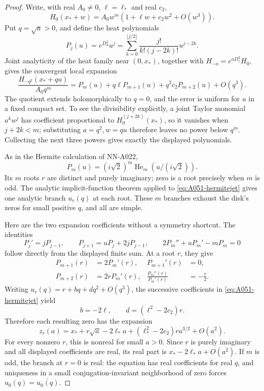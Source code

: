 \begin{proof}
Write, with real \(A_0\ne0\), \(\ell=\ell_*\) and real \(c_2\),
\[
 H_0(x_*+w)=A_0w^m(1+\ell w+c_2w^2+O(w^3)).
\]
Put \(q=\sqrt a>0\), and define the heat polynomials
\[
 P_j(u)=e^{D_u^2}u^j
       =\sum_{k=0}^{\lfloor j/2\rfloor}
          \frac{j!}{k!(j-2k)!}u^{j-2k}.
\]
Joint analyticity of the heat family near \((0,x_*)\), together
with \(H_{-a}=e^{aD_z^2}H_0\), gives the convergent local expansion
\begin{equation}\label{eq:A051-hermitejet}
 \frac{H_{-q^2}(x_*+qu)}{A_0q^m}
     =P_m(u)+q\ell P_{m+1}(u)+q^2c_2P_{m+2}(u)+O(q^3).
\end{equation}
The quotient extends holomorphically to \(q=0\), and the error
is uniform for \(u\) in a fixed compact set. To see the
divisibility explicitly, a joint Taylor monomial \(a^kw^j\)
has coefficient proportional to \(H_0^{(j+2k)}(x_*)\), so it
vanishes when \(j+2k<m\); substituting \(a=q^2,w=qu\)
therefore leaves no power below \(q^m\). Collecting the next
three powers gives exactly the displayed polynomials.

As in the Hermite calculation of NN-A022,
\[
       P_m(u)=(i\sqrt2)^m
                     \operatorname{He}_m(u/(i\sqrt2)).
\]
Its \(m\) roots \(r\) are distinct and purely imaginary;
zero is a root precisely when \(m\) is odd.
The analytic implicit-function theorem applied to
\eqref{eq:A051-hermitejet} gives one analytic branch \(u_r(q)\)
at each root. These \(m\) branches exhaust the disk's zeros
for small positive \(q\), and all are simple.

Here are the two expansion coefficients without a symmetry
shortcut. The identities
\[
 P_j'=jP_{j-1},\qquad
 P_{j+1}=uP_j+2jP_{j-1},\qquad
 2P_m''+uP_m'-mP_m=0
\]
follow directly from the displayed finite sum. At a root \(r\),
they give
\begin{align*}
 P_{m+1}(r)&=2P_m'(r),& P_{m+1}'(r)&=0,\\
 P_{m+2}(r)&=2rP_m'(r),&
 \frac{P_m''(r)}{P_m'(r)}&=-\frac r2.
\end{align*}
Writing \(u_r(q)=r+bq+dq^2+O(q^3)\), the successive
coefficients in \eqref{eq:A051-hermitejet} yield
\[
                 b=-2\ell,\qquad d=(\ell^2-2c_2)r.
\]
Therefore each resulting zero has the expansion
\begin{equation}\label{eq:A051-localfirstdrift}
 z_r(a)=x_*+r\sqrt a-2\ell_*a
                   +(\ell_*^2-2c_2)r a^{3/2}+O(a^2).
\end{equation}
For every nonzero \(r\), this is nonreal for small \(a>0\).
Since \(r\) is purely imaginary and all displayed coefficients
are real, its real part is \(x_*-2\ell_*a+O(a^2)\).
If \(m\) is odd, the branch at \(r=0\) is real: the equation
has real coefficients for real \(q\), and uniqueness in a small
conjugation-invariant neighborhood of zero forces
\(u_0(q)=\overline{u_0(q)}\).


\end{proof}
